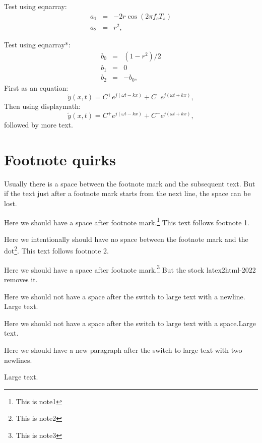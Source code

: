 \documentclass[12pt]{amsart}
\begin{document}
Test using eqnarray:
\begin{eqnarray}
a_1 &=& -2 r \cos( 2 \pi f_c T_s ) \\
a_2 &=& r^2,
\end{eqnarray}

Test using eqnarray*:
\begin{eqnarray*}
b_0 &=& (1 - r^2) / 2 \\
b_1 &=& 0 \\
b_2 &=& -b_0,
\end{eqnarray*}
First as an equation:
\begin{equation}
\tilde{y}(x,t) = C^{+} e^{j (\omega t - k x)} + C^{-} e^{j (\omega t + k x)},
\label{eq:yxt}
\end{equation}
Then using displaymath:
\begin{displaymath}
  \tilde{y}(x,t) = C^{+} e^{j (\omega t - k x)} + C^{-} e^{j (\omega t + k x)},
\end{displaymath}
followed by more text.

%
%
%

\section{Footnote quirks}

Usually there is a space between the footnote mark and the subsequent text.
But if the text just after a footnote mark starts from the next line,
the space can be lost.

Here we should have a space after footnote
mark.\footnote{This is note1} This text follows footnote 1.

Here we intentionally should have no space between the footnote
mark and the dot\footnote{This is note2}. This text follows footnote 2.

Here we should have a space after footnote
mark.\footnote{This is note3}
But the stock latex2html-2022 removes it.

{Here we should not have a space after the
switch to large text with a newline.\large
Large text.}

{Here we should not have a space after the
switch to large text with a space.\large Large text.}

{Here we should have a new paragraph after the
switch to large text with two newlines.\large

Large text.}
\end{document}
